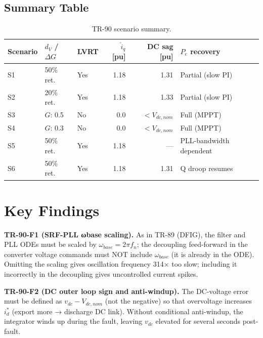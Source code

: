 \documentclass[11pt,a4paper]{article}
\begin{document}
\FloatBarrier

\subsection{Summary Table}

\begin{table}[H]
  \centering
  \caption{TR-90 scenario summary.}
  \label{tab:summary}
  \begin{tabular}{lllrrl}
    \toprule
    Scenario & $d_V$ / $\Delta G$ & LVRT & $\hat{i}_q$ [pu] &
    DC sag [pu] & $P_e$ recovery \\
    \midrule
    S1 & 50\% ret.  & Yes & 1.18 & 1.31 & Partial (slow PI) \\
    S2 & 20\% ret.  & Yes & 1.18 & 1.33 & Partial (slow PI) \\
    S3 & $G$: 0.5   & No  & 0.0  & $<V_{dc,nom}$ & Full (MPPT) \\
    S4 & $G$: 0.3   & No  & 0.0  & $<V_{dc,nom}$ & Full (MPPT) \\
    S5 & 50\% ret.  & Yes & 1.18 & — & PLL-bandwidth dependent \\
    S6 & 50\% ret.  & Yes & 1.18 & 1.31 & Q droop resumes \\
    \bottomrule
  \end{tabular}
\end{table}

\section{Key Findings}

\begin{mdframed}
\textbf{TR-90-F1 (SRF-PLL ωbase scaling).}
As in TR-89 (DFIG), the filter and PLL ODEs must be scaled by
$\omega_{base} = 2\pi f_n$; the decoupling feed-forward in the converter
voltage commands must NOT include $\omega_{base}$ (it is already in the
ODE).  Omitting the scaling gives oscillation frequency 314× too slow;
including it incorrectly in the decoupling gives uncontrolled current spikes.
\end{mdframed}

\vspace{6pt}

\begin{mdframed}
\textbf{TR-90-F2 (DC outer loop sign and anti-windup).}
The DC-voltage error must be defined as $v_{dc} - V_{dc,nom}$ (not the
negative) so that overvoltage increases $i_d^\ast$ (export more →
discharge DC link).  Without conditional anti-windup, the integrator
winds up during the fault, leaving $v_{dc}$ elevated for several
seconds post-fault.
\end{mdframed}
\end{document}
